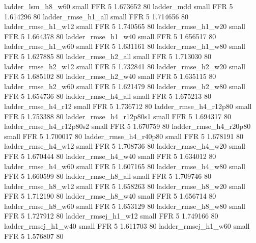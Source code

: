        ladder_lsm_h8_w60      small      FFR                 5 1.673652 80
              ladder_mdd      small      FFR                 5 1.614296 80
      ladder_rmse_h1_all      small      FFR                 5 1.714656 80
      ladder_rmse_h1_w12      small      FFR                 5 1.740565 80
      ladder_rmse_h1_w20      small      FFR                 5 1.664378 80
      ladder_rmse_h1_w40      small      FFR                 5 1.656517 80
      ladder_rmse_h1_w60      small      FFR                 5 1.631161 80
      ladder_rmse_h1_w80      small      FFR                 5 1.627885 80
      ladder_rmse_h2_all      small      FFR                 5 1.713030 80
      ladder_rmse_h2_w12      small      FFR                 5 1.732841 80
      ladder_rmse_h2_w20      small      FFR                 5 1.685102 80
      ladder_rmse_h2_w40      small      FFR                 5 1.635115 80
      ladder_rmse_h2_w60      small      FFR                 5 1.621479 80
      ladder_rmse_h2_w80      small      FFR                 5 1.654736 80
      ladder_rmse_h4_all      small      FFR                 5 1.675213 80
      ladder_rmse_h4_r12      small      FFR                 5 1.736712 80
   ladder_rmse_h4_r12p80      small      FFR                 5 1.753388 80
 ladder_rmse_h4_r12p80s1      small      FFR                 5 1.694317 80
 ladder_rmse_h4_r12p80s2      small      FFR                 5 1.670759 80
   ladder_rmse_h4_r20p80      small      FFR                 5 1.700017 80
   ladder_rmse_h4_r40p80      small      FFR                 5 1.678191 80
      ladder_rmse_h4_w12      small      FFR                 5 1.708736 80
      ladder_rmse_h4_w20      small      FFR                 5 1.670444 80
      ladder_rmse_h4_w40      small      FFR                 5 1.634012 80
      ladder_rmse_h4_w60      small      FFR                 5 1.607165 80
      ladder_rmse_h4_w80      small      FFR                 5 1.660599 80
      ladder_rmse_h8_all      small      FFR                 5 1.709746 80
      ladder_rmse_h8_w12      small      FFR                 5 1.658263 80
      ladder_rmse_h8_w20      small      FFR                 5 1.712190 80
      ladder_rmse_h8_w40      small      FFR                 5 1.656714 80
      ladder_rmse_h8_w60      small      FFR                 5 1.653129 80
      ladder_rmse_h8_w80      small      FFR                 5 1.727912 80
     ladder_rmsej_h1_w12      small      FFR                 5 1.749166 80
     ladder_rmsej_h1_w40      small      FFR                 5 1.611703 80
     ladder_rmsej_h1_w60      small      FFR                 5 1.576807 80
